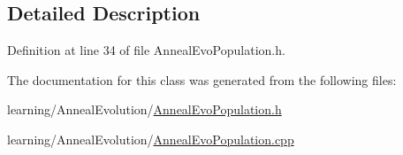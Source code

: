 \subsection{Detailed Description}


Definition at line 34 of file Anneal\-Evo\-Population.\-h.



The documentation for this class was generated from the following files\-:\begin{DoxyCompactItemize}
\item 
learning/\-Anneal\-Evolution/\hyperlink{_anneal_evo_population_8h}{Anneal\-Evo\-Population.\-h}\item 
learning/\-Anneal\-Evolution/\hyperlink{_anneal_evo_population_8cpp}{Anneal\-Evo\-Population.\-cpp}\end{DoxyCompactItemize}
